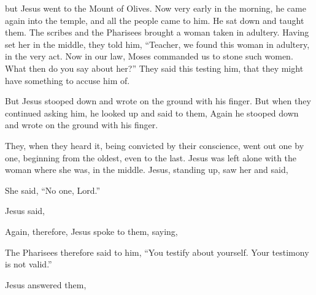 {but Jesus went to the Mount of Olives.
Now very early in the morning, he came again into the temple, and all the people came to him. He sat down and taught them.
The scribes and the Pharisees brought a woman taken in adultery. Having set her in the middle,
they told him, “Teacher, we found this woman in adultery, in the very act.
Now in our law, Moses commanded us to stone such women. What then do you say about her?”
They said this testing him, that they might have something to accuse him of.
\par }{\PP But Jesus stooped down and wrote on the ground with his finger.
But when they continued asking him, he looked up and said to them,
{}
Again he stooped down and wrote on the ground with his finger.
\par }{\PP {}They, when they heard it, being convicted by their conscience, went out one by one, beginning from the oldest, even to the last. Jesus was left alone with the woman where she was, in the middle.
Jesus, standing up, saw her and said,
{}
\par }{\PP {}She said, “No one, Lord.”
\par }{\PP Jesus said,
{}
\par }{\PP {}Again, therefore, Jesus spoke to them, saying,
{}
{}
\par }{\PP {}The Pharisees therefore said to him, “You testify about yourself. Your testimony is not valid.”
\par }{\PP {}Jesus answered them,
{}
}
